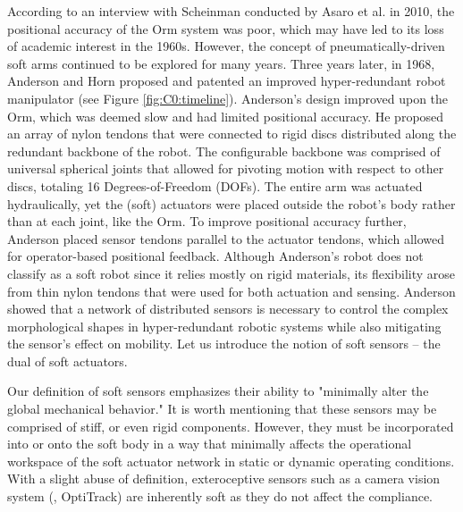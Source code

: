 According to an interview with Scheinman conducted by Asaro et al. \cite{ETHW2020Dec} in 2010, the positional accuracy of the Orm system was poor, which may have led to its loss of academic interest in the 1960s. However, the concept of pneumatically-driven soft arms continued to be explored for many years. Three years later, in 1968, Anderson and Horn proposed and patented an improved hyper-redundant robot manipulator (see Figure \ref{fig:C0:timeline}). Anderson's design improved upon the Orm, which was deemed slow and had limited positional accuracy. He proposed an array of nylon tendons that were connected to rigid discs distributed along the redundant backbone of the robot. The configurable backbone was comprised of universal spherical joints that allowed for pivoting motion with respect to other discs, totaling 16 Degrees-of-Freedom (DOFs). The entire arm was actuated hydraulically, yet the (soft) actuators were placed outside the robot's body rather than at each joint, like the Orm. To improve positional accuracy further, Anderson placed sensor tendons parallel to the actuator tendons, which allowed for operator-based positional feedback. Although Anderson's robot does not classify as a soft robot since it relies mostly on rigid materials, its flexibility arose from thin nylon tendons that were used for both actuation and sensing. Anderson showed that a network of distributed sensors is necessary to control the complex morphological shapes in hyper-redundant robotic systems while also mitigating the sensor's effect on mobility. Let us introduce the notion of soft sensors -- the dual of soft actuators.
%
\vspace{-3mm}

\begin{rmk}
\vspace{-1mm}
Our definition of soft sensors emphasizes their ability to "minimally alter the global mechanical behavior." It is worth mentioning that these sensors may be comprised of stiff, or even rigid components. However, they must be incorporated into or onto the soft body in a way that minimally affects the operational workspace of the soft actuator network in static or dynamic operating conditions. With a slight abuse of definition, exteroceptive sensors such as a camera vision system (\eg, OptiTrack) are inherently soft as they do not affect the compliance.
\end{rmk}

